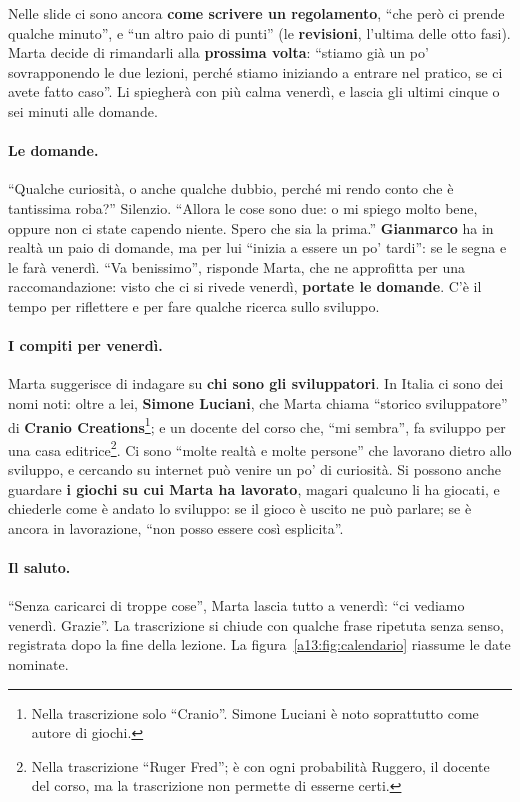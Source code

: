 Nelle slide ci sono ancora \textbf{come scrivere un regolamento}, ``che però ci prende qualche
minuto'', e ``un altro paio di punti'' (le \textbf{revisioni}, l'ultima delle otto fasi). Marta
decide di rimandarli alla \textbf{prossima volta}: ``stiamo già un po' sovrapponendo le due
lezioni, perché stiamo iniziando a entrare nel pratico, se ci avete fatto caso''. Li
spiegherà con più calma venerdì, e lascia gli ultimi cinque o sei minuti alle domande.

\paragraph{Le domande.} ``Qualche curiosità, o anche qualche dubbio, perché mi rendo conto che
è tantissima roba?'' Silenzio. ``Allora le cose sono due: o mi spiego molto bene, oppure non
ci state capendo niente. Spero che sia la prima.'' \textbf{Gianmarco} ha in realtà un paio di
domande, ma per lui ``inizia a essere un po' tardi'': se le segna e le farà venerdì. ``Va
benissimo'', risponde Marta, che ne approfitta per una raccomandazione: visto che ci si
rivede venerdì, \textbf{portate le domande}. C'è il tempo per riflettere e per fare qualche
ricerca sullo sviluppo.

\paragraph{I compiti per venerdì.} Marta suggerisce di indagare su \textbf{chi sono gli
sviluppatori}. In Italia ci sono dei nomi noti: oltre a lei, \textbf{Simone Luciani}, che
Marta chiama ``storico sviluppatore'' di \textbf{Cranio Creations}\footnote{Nella trascrizione
solo ``Cranio''. Simone Luciani è noto soprattutto come autore di giochi.}; e un docente del
corso che, ``mi sembra'', fa sviluppo per una casa editrice\footnote{Nella trascrizione
``Ruger Fred''; è con ogni probabilità Ruggero, il docente del corso, ma la trascrizione
non permette di esserne certi.}. Ci sono ``molte realtà e molte persone'' che lavorano dietro
allo sviluppo, e cercando su internet può venire un po' di curiosità. Si possono anche
guardare \textbf{i giochi su cui Marta ha lavorato}, magari qualcuno li ha giocati, e chiederle
come è andato lo sviluppo: se il gioco è uscito ne può parlare; se è ancora in lavorazione,
``non posso essere così esplicita''.

\paragraph{Il saluto.} ``Senza caricarci di troppe cose'', Marta lascia tutto a venerdì: ``ci
vediamo venerdì. Grazie''. La trascrizione si chiude con qualche frase ripetuta senza senso,
registrata dopo la fine della lezione. La figura~\ref{a13:fig:calendario} riassume le date
nominate.

